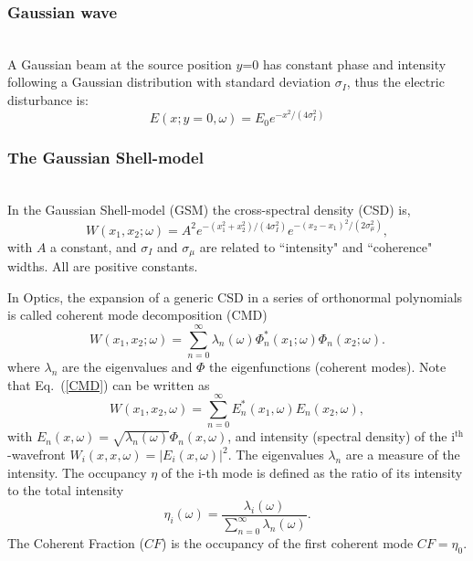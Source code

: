 \documentclass{iopconfser}
\begin{document}
\subsubsection{Gaussian wave}\hspace*{\fill} \\
A Gaussian beam at the source position $y$=0 has constant phase and intensity following a Gaussian distribution with standard deviation $\sigma_I$, thus the electric disturbance is: 
\begin{equation}
\label{eq:gaussianSource}
    E(x;y=0,\omega) = E_0 e^{-x^2 / (4 \sigma_I^2)}
\end{equation}

\subsubsection{The Gaussian Shell-model}\hspace*{\fill} \\
In the Gaussian Shell-model (GSM) the cross-spectral density (CSD) is, 
\begin{equation}
W(x_1,x_2;\omega) = A^2 e^{-(x_1^2+x_2^2)/(4 \sigma_I^2)} e^{-(x_2-x_1)^2/(2 \sigma_{\mu}^2)},
\label{GS_CSD}
\end{equation} 
with $A$ a constant, and $\sigma_I$ and $\sigma_\mu$ are related to ``intensity" and  ``coherence" widths. All are positive constants. 

In Optics, the expansion of a generic CSD in a series of orthonormal polynomials is called coherent mode decomposition (CMD)  
\citep{mandel_wolf}
\begin{equation}
W(x_1,x_2;\omega) = \sum_{n=0}^{\infty} \lambda_n(\omega) \Phi_n^*(x_1;\omega) \Phi_n(x_2;\omega). 
\label{CMD}
\end{equation}
where $\lambda_n$ are the eigenvalues and $\Phi$ the eigenfunctions (coherent modes). 
Note that Eq.~(\ref{CMD}) can be written as 
\begin{equation}
W(x_1,x_2,\omega) = \sum_{n=0}^{\infty} E_n^*(x_1,\omega) E_n(x_2,\omega), 
\end{equation} with $E_n(x, \omega) = \sqrt{\lambda_n(\omega)} \Phi_n(x,\omega)$, and intensity (spectral density) of the i$^\text{th}$-wavefront $W_i(x, x, \omega) =  |E_i(x, \omega)|^2$.
The eigenvalues $\lambda_n$ are a measure of the intensity.
The occupancy $\eta$ of the i-th mode is defined as the ratio of its intensity to the total intensity 
\begin{equation}
\eta_i(\omega) = \frac{\lambda_i(\omega)}{\sum_{n=0}^{\infty} \lambda_n(\omega)}.
\end{equation}
The Coherent Fraction ($CF$) is the occupancy of the first coherent mode $CF=\eta_0$.
\end{document}
